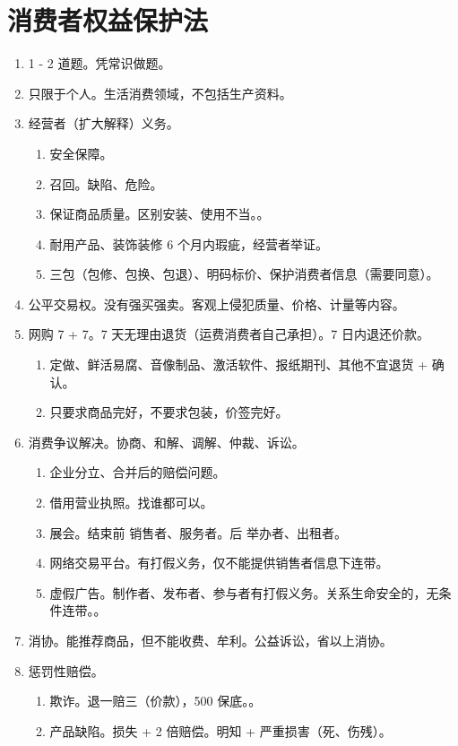 \section{消费者权益保护法}
\begin{enumerate}
  \item 1 - 2 道题。凭常识做题。
  \item 只限于个人。生活消费领域，不包括生产资料。
  \item 经营者（扩大解释）义务。
        \begin{enumerate}
          \item 安全保障。
          \item 召回。缺陷、危险。
          \item 保证商品质量。区别安装、使用不当。。
          \item 耐用产品、装饰装修 6 个月内瑕疵，经营者举证。
          \item 三包（包修、包换、包退）、明码标价、保护消费者信息（需要同意）。
        \end{enumerate}
  \item 公平交易权。没有强买强卖。客观上侵犯质量、价格、计量等内容。
  \item 网购 7 + 7。7 天无理由退货（运费消费者自己承担）。7 日内退还价款。
        \begin{enumerate}
          \item 定做、鲜活易腐、音像制品、激活软件、报纸期刊、其他不宜退货 + 确认。
          \item 只要求商品完好，不要求包装，价签完好。
        \end{enumerate}
  \item 消费争议解决。协商、和解、调解、仲裁、诉讼。
        \begin{enumerate}
          \item 企业分立、合并后的赔偿问题。
          \item 借用营业执照。找谁都可以。
          \item 展会。结束前 \yjt 销售者、服务者。后 \yjt 举办者、出租者。
          \item 网络交易平台。有打假义务，仅不能提供销售者信息下连带。
          \item 虚假广告。制作者、发布者、参与者有打假义务。关系生命安全的，无条件连带。。
        \end{enumerate}
  \item 消协。能推荐商品，但不能收费、牟利。公益诉讼，省以上消协。
  \item 惩罚性赔偿。
        \begin{enumerate}
          \item 欺诈。退一赔三（价款），500 保底。。
          \item 产品缺陷。损失 + 2 倍赔偿。明知 + 严重损害（死、伤残）。
        \end{enumerate}
\end{enumerate}
